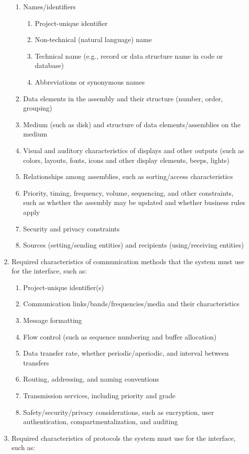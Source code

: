 \begin{enumerate}
  \begin{enumerate}
  \itemsep1pt\parskip0pt
  \item
    Names/identifiers

    \begin{enumerate}
    \itemsep1pt\parskip0pt
    \item
      Project-unique identifier
    \item
      Non-technical (natural language) name
    \item
      Technical name (e.g., record or data structure name in code or
      database)
    \item
      Abbreviations or synonymous names
    \end{enumerate}
  \item
    Data elements in the assembly and their structure (number, order,
    grouping)
  \item
    Medium (such as disk) and structure of data elements/assemblies on
    the medium
  \item
    Visual and auditory characteristics of displays and other outputs
    (such as colors, layouts, fonts, icons and other display elements,
    beeps, lights)
  \item
    Relationships among assemblies, such as sorting/access
    characteristics
  \item
    Priority, timing, frequency, volume, sequencing, and other
    constraints, such as whether the assembly may be updated and whether
    business rules apply
  \item
    Security and privacy constraints
  \item
    Sources (setting/sending entities) and recipients (using/receiving
    entities)
  \end{enumerate}
\item
  Required characteristics of communication methods that the system must
  use for the interface, such as:

  \begin{enumerate}
  \itemsep1pt\parskip0pt
  \item
    Project-unique identifier(s)
  \item
    Communication links/bands/frequencies/media and their
    characteristics
  \item
    Message formatting
  \item
    Flow control (such as sequence numbering and buffer allocation)
  \item
    Data transfer rate, whether periodic/aperiodic, and interval between
    transfers
  \item
    Routing, addressing, and naming conventions
  \item
    Transmission services, including priority and grade
  \item
    Safety/security/privacy considerations, such as encryption, user
    authentication, compartmentalization, and auditing
  \end{enumerate}
\item
  Required characteristics of protocols the system must use for the
  interface, such as:


\end{enumerate}
